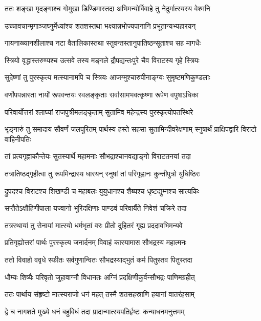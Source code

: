 \twolineshloka
{ततः शङ्खा मृदङ्गाश्च गोमुखा डिण्डिमास्तदा}
{अभिमन्योर्विवाहे तु नेदुर्मात्स्यस्य वेश्मनि}


\twolineshloka
{उच्चावचान्मृगाञ्जघ्नुर्मेध्यांश्च शतशस्तथा}
{भक्ष्यान्नभोज्यपानानि प्रभूतान्यभ्यहारयन्}


\twolineshloka
{गायनाख्यानशीलाश्च नटा वैतालिकास्तथा}
{स्तुवन्तस्तानुपातिष्ठन्सूताश्च सह मागधैः}


\twolineshloka
{स्त्रियो वृद्धास्तरुण्यश्च उत्सवे तस्य मङ्गले}
{द्रौपद्यन्तःपुरे चैव विराटस्य गृहे स्त्रियः}


\twolineshloka
{सुदेष्णां तु पुरस्कृत्य मत्स्यानामपि च स्त्रियः}
{आजग्मुश्चारुपीनाङ्ग्यः सुमृष्टमणिकुण्डलाः}


\twolineshloka
{वर्णोपपन्नास्ता नार्यो रूपवन्तयः स्वलङ्कृताः}
{सर्वासामभवत्कृष्णा रूपेण वपुषाऽधिका}


\twolineshloka
{परिवार्योत्तरां श्लाघ्यां राजपुत्रीमलङ्कृताम्}
{सुतामिव महेन्द्रस्य पुरस्कृत्योपतस्थिरे}


\threelineshloka
{भृङ्गारुं तु समादाय सौवर्णं जलपूरितम्}
{पार्थस्य हस्ते सहसा सुतामिन्दीवरेक्षणाम्}
{स्नुषार्थं प्राक्षिपद्वारि विराटो वाहिनीपतिः}


\twolineshloka
{तां प्रत्यगृह्णाकौन्तेयः सुतस्यार्थे महामनाः}
{सौभद्राश्चानवद्याङ्गो विराटतनयां तदा}


\twolineshloka
{तत्रातिष्ठद्गृहीत्वा तु रूपमिन्द्रास्य धारयन्}
{स्नुषां तां परिगृह्णानः कुन्तीपुत्रो युधिष्ठिरः}


\twolineshloka
{द्रुपदश्च विराटश्च शिखण्डी च महाबलः}
{युयुधानश्च शैब्यश्च धृष्टद्युम्नश्च सात्यकिः}


\twolineshloka
{सप्तैतेऽक्षौहिणीपाला यज्वानो भूरिदक्षिणाः}
{पाण्डवं परिवार्यैते निवेशं चक्रिरे तदा}


\twolineshloka
{तत्रस्थायां तु सेनायां मात्स्यो धर्मभृतां वरः}
{प्रीतो दुहितरं गृह्य प्रददावभिमन्यवे}


\twolineshloka
{प्रतिगृह्योत्तरां पार्थः पुरस्कृत्य जनार्दनम्}
{विवाहं कारयामास सौभद्रस्य महात्मनः}


\twolineshloka
{ततो विवाहो ववृधे स्फीतः सर्वगुणान्वितः}
{सौभद्रस्याद्भुतं कर्म पितुस्तव पितुस्तदा}


\twolineshloka
{धौम्यः शिष्यैः परिवृतो जुहावाग्नौ विधानतः}
{अग्निं प्रदक्षिणीकुर्वन्सौभद्रः पाणिमग्रहीत्}


\twolineshloka
{ततः पार्थाय संहृष्टो मात्स्यराजो धनं महत्}
{तस्मै शतसहस्राणि हयानां वातरंहसाम्}


\twolineshloka
{द्वे च नागशते मुख्ये धनं बहुविधं तदा}
{प्रादान्मात्स्यपतिर्हृष्टः कन्याधनमनुत्तमम्}


